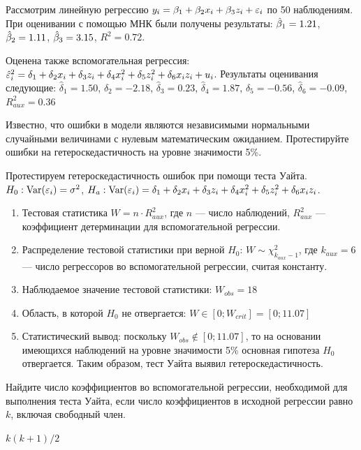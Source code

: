 \begin{problem}
Рассмотрим линейную регрессию $y_i = \beta_1 + \beta_2 x_i + \beta_3 z_i + \varepsilon_i$ по 50 наблюдениям. При оценивании с помощью МНК были получены результаты: $\hat{\beta}_1=1.21$, $\hat{\beta}_2=1.11$, $\hat{\beta}_3=3.15$, $R^2=0.72$.

Оценена также вспомогательная регрессия: $\hat{\varepsilon}^2_i=\delta_1+\delta_2 x_i +\delta_3 z_i+\delta_4 x_i^2+\delta_5 z_i^2+\delta_6 x_i z_i + u_i$. Результаты оценивания следующие: $\hat{\delta}_1=1.50$, $\hat{\delta}_2=-2.18$,  $\hat{\delta}_3=0.23$,  $\hat{\delta}_4=1.87$,  $\hat{\delta}_5=-0.56$,  $\hat{\delta}_6=-0.09$,  $R^2_{aux}=0.36$


Известно, что ошибки в модели являются независимыми нормальными случайными величинами с нулевым математическим ожиданием. Протестируйте
ошибки на гетероскедастичность на уровне значимости 5\%.


\begin{sol}
Протестируем гетероскедастичность ошибок при помощи теста Уайта. $H_0: \operatorname{Var}(\varepsilon_i)=\sigma^2$, $H_a: \operatorname{Var}(\varepsilon_i)=\delta_1+\delta_2 x_i +\delta_3 z_i+\delta_4 x_i^2+\delta_5 z_i^2+\delta_6 x_i z_i$.
\begin{enumerate}
\item Тестовая статистика $W=n\cdot R^2_{aux}$, где $n$ — число наблюдений, $R^2_{aux}$ — коэффициент детерминации для вспомогательной регрессии.
\item Распределение тестовой статистики при верной $H_0$: $W\sim \chi^2_{k_{aux}-1}$, где $k_{aux}=6$ — число регрессоров во вспомогательной регрессии, считая константу.
\item Наблюдаемое значение тестовой статистики: $W_{obs}=18$
\item Область, в которой $H_0$ не отвергается: $W\in [0;W_{crit}]=[0;11.07]$
\item Статистический вывод: поскольку $W_{obs} \notin [0;11.07]$, то на основании имеющихся наблюдений на уровне значимости 5\% основная гипотеза $H_0$ отвергается. Таким образом, тест Уайта выявил гетероскедастичность.
\end{enumerate}
\end{sol}
\end{problem}

\begin{problem}
Найдите число коэффициентов во вспомогательной регрессии, необходимой для выполнения теста Уайта, если число коэффициентов в исходной регрессии равно $k$, включая свободный член.

\begin{sol}
$k(k+1)/2$
\end{sol}
\end{problem}


